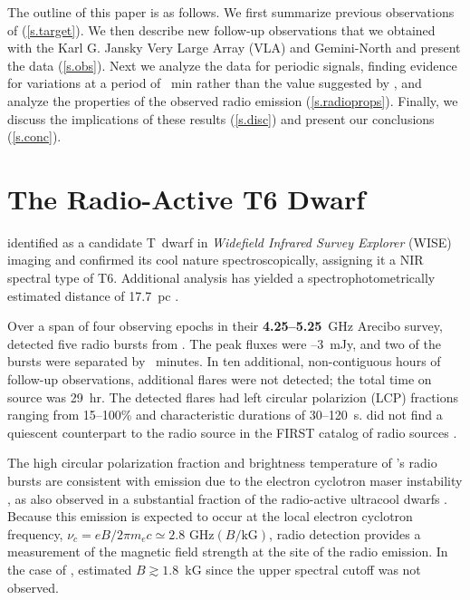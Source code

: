 \documentclass[twocolumn, times]{aastex6}
\begin{document}
The outline of this paper is as follows. We first summarize previous
observations of  (\autoref{s.target}). We then describe new
follow-up observations that we obtained with the Karl G. Jansky Very Large
Array (VLA) and Gemini-North and present the data (\autoref{s.obs}). Next we
analyze the data for periodic signals, finding evidence for variations at a
period of ~min rather than the value suggested by \citet{rw16}, and
analyze the properties of the observed radio emission
(\autoref{s.radioprops}). Finally, we discuss the implications of these
results (\autoref{s.disc}) and present our conclusions (\autoref{s.conc}).


\section{The Radio-Active T6 Dwarf }
\label{s.target}

\citet{kcg+11} identified  as a candidate T~dwarf in
\textit{Widefield Infrared Survey Explorer} (WISE) imaging and confirmed its
cool nature spectroscopically, assigning it a NIR spectral type of T6.
Additional analysis has yielded a spectrophotometrically estimated distance of
17.7~pc \citep{kgc+12}.

Over a span of four observing epochs in their \textbf{4.25--5.25}~GHz Arecibo survey,
\citet{rw13, rw16} detected five radio bursts from . The peak
fluxes were --3~mJy, and two of the bursts were separated by
~minutes. In ten additional, non-contiguous hours of follow-up
observations, additional flares were not detected; the total time on source
was 29~hr. The detected flares had left circular polarizion (LCP) fractions
ranging from 15--100\% and characteristic durations of 30--120~s. \citet{rw16}
did not find a quiescent counterpart to the radio source in the FIRST catalog
of radio sources \citep{bwh95}.

The high circular polarization fraction and brightness temperature of
's radio bursts are consistent with emission due to the electron
cyclotron maser instability \citep[ECMI;][]{the.ecmi, t06}, as also observed
in a substantial fraction of the radio-active ultracool dwarfs \citep{bp05,
  had+06, had+08, brpb+09, rw12, wb15}. Because this emission is expected to
occur at the local electron cyclotron frequency, $\nu_c = e B / 2\pi m_e c
\simeq 2.8\text{ GHz} (B / \text{kG})$, radio detection provides a measurement
of the magnetic field strength at the site of the radio emission. In the case
of , \citet{rw16} estimated $B \gtrsim 1.8$~kG since the upper
spectral cutoff was not observed.
\end{document}
